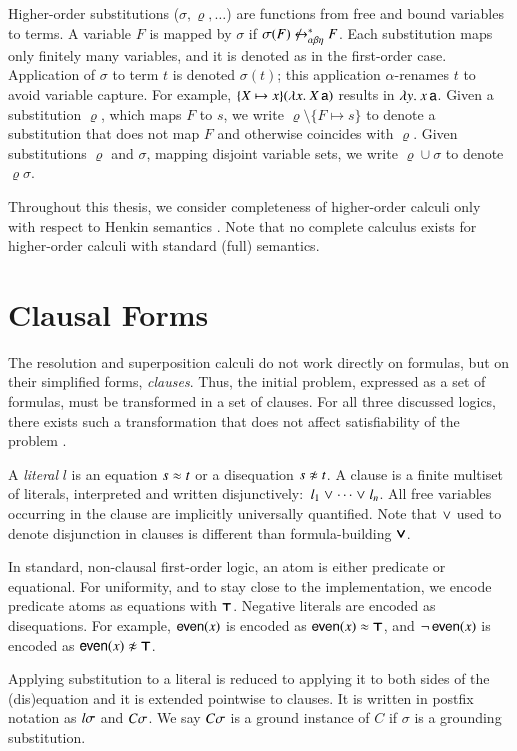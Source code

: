 Higher-order substitutions ($\sigma,\varrho,\ldots$) are functions from free and bound
variables to terms. A variable $F$ is mapped by $\sigma$ if $ \sigma(F) \not\equi
F$. Each substitution maps only finitely many variables, and it is denoted as in
the first-order case. Application of  $\sigma$ to term $t$ is denoted $\sigma(t)$;
this application $\alpha$-renames $t$ to avoid variable capture. For example,
$\{X \mapsto x\}(\lambda x.\> X \, \mathsf{a})$ results in $\lambda y.\> x \, \mathsf{a}$.  Given a substitution
$\varrho$, which maps $F$ to $s$, we write $\varrho\setminus\{F \mapsto s\}$ to
denote a substitution that does not map $F$ and otherwise coincides with
$\varrho$. Given substitutions $\varrho$ and $\sigma$, mapping disjoint variable
sets, we write $\varrho \cup \sigma$ to denote $\varrho\sigma$.

Throughout this thesis, we consider completeness of higher-order calculi only
with respect to Henkin semantics \cite{bm-14-automation-ho}. Note that no
complete calculus exists for higher-order calculi with standard (full)
semantics.

\section{Clausal Forms}

The resolution and superposition calculi do not work directly on formulas, but
on their simplified forms, {\em clauses}. Thus, the initial problem, expressed as a
set of formulas, must be transformed in a set of clauses. For all three
discussed logics, there exists such a transformation that does not affect
satisfiability of the problem \cite{nw-01-small-cnf}.

A {\em literal} $l$ is an equation $s \approx t$ or a disequation $s \noteq t$. A clause is a
finite multiset of literals, interpreted and written disjunctively:\ $l_1 \mathrel\lor
\cdots \mathrel\lor l_n$. All free variables occurring in the clause are implicitly
universally quantified. Note that $\mathrel\lor$ used to denote disjunction in clauses
is different than formula-building $\pmb\lor$.

In standard, non-clausal first-order logic, an atom is either
predicate or equational. For uniformity, and to
stay close to the implementation, we encode predicate atoms as equations with
$\pmb\top$. Negative literals are encoded as disequations. For example,
$\mathsf{even}(x)$ is encoded as $\mathsf{even}(x) \approx \pmb\top$, and
$\neg\,\mathsf{even}(x)$ is encoded as $\neglit{\cst{even}(x)}$. 

Applying substitution to a literal is reduced to applying it to both sides of
the (dis)equa\-tion and it is extended pointwise to clauses. It is written in
postfix notation as $l\sigma$ and $C\sigma$. We say $C\sigma$ is a
ground instance of $C$ if $\sigma$ is a grounding substitution.

